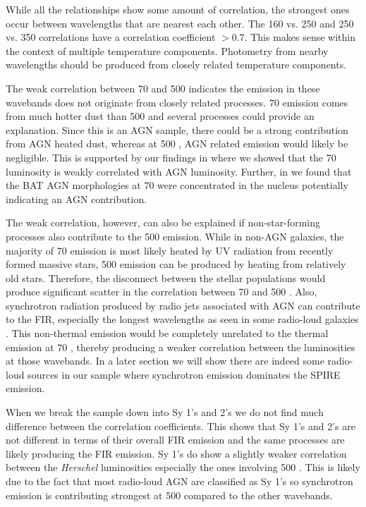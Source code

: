 While all the relationships show some amount of correlation, the strongest ones occur between wavelengths that are nearest each other. The 160 vs. 250 \um{} and 250 vs. 350 \um{} correlations have a correlation coefficient $>0.7$. This makes sense within the context of multiple temperature components. Photometry from nearby wavelengths should be produced from closely related temperature components.

The weak correlation between 70 and 500 \um{} indicates the emission in these wavebands does not originate from closely related processes. 70 \um{} emission comes from much hotter dust than 500 \um{} and several processes could provide an explanation. Since this is an AGN sample, there could be a strong contribution from AGN heated dust, whereas at 500 \um{}, AGN related emission would likely be negligible. This is supported by our findings in \citet{Melendez:2014yu} where we showed that the 70 \um{} luminosity is weakly correlated with AGN luminosity. Further, in \citet{Mushotzky:2014ad} we found that the BAT AGN morphologies at 70 \um{} were concentrated in the nucleus potentially indicating an AGN contribution.

The weak correlation, however, can also be explained if non-star-forming processes also contribute to the 500 \um{} emission. While in non-AGN galaxies, the majority of 70 \um{} emission is most likely heated by UV radiation from recently formed massive stars, 500 \um{} emission can be produced by heating from relatively old stars. Therefore, the disconnect between the stellar populations would produce significant scatter in the correlation between 70 and 500 \um. Also, synchrotron radiation produced by radio jets associated with AGN can contribute to the FIR, especially the longest wavelengths as seen in some radio-loud galaxies \citep{Baes:2010ek,Boselli:2010fr}. This non-thermal emission would be completely unrelated to the thermal emission at 70 \um, thereby producing a weaker correlation between the luminosities at those wavebands. In a later section we will show there are indeed some radio-loud sources in our sample where synchrotron emission dominates the SPIRE emission. 

When we break the sample down into Sy 1's and 2's we do not find much difference between the correlation coefficients. This shows that Sy 1's and 2's are not different in terms of their overall FIR emission and the same processes are likely producing the FIR emission. Sy 1's do show a slightly weaker correlation between the \textit{Herschel} luminosities especially the ones involving 500 \um. This is likely due to the fact that most radio-loud AGN are classified as Sy 1's so synchrotron emission is contributing strongest at 500 \um{} compared to the other wavebands.
  
  